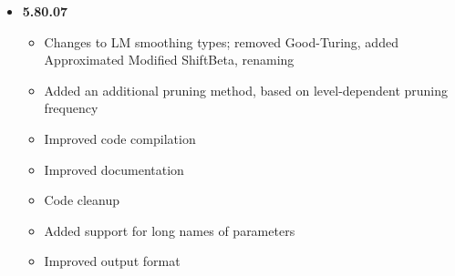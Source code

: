\begin{itemize}
\begin{itemize}
\end{itemize}
\item {\bf 5.80.07}
\begin{itemize}
\item Changes to LM smoothing types; removed Good-Turing, added Approximated Modified ShiftBeta, renaming
\item Added an additional pruning method, based on level-dependent pruning frequency
\item Improved code compilation
\item Improved documentation
\item Code cleanup
\item Added support for long names of parameters
\item Improved output format 
\end{itemize}
\end{itemize}



